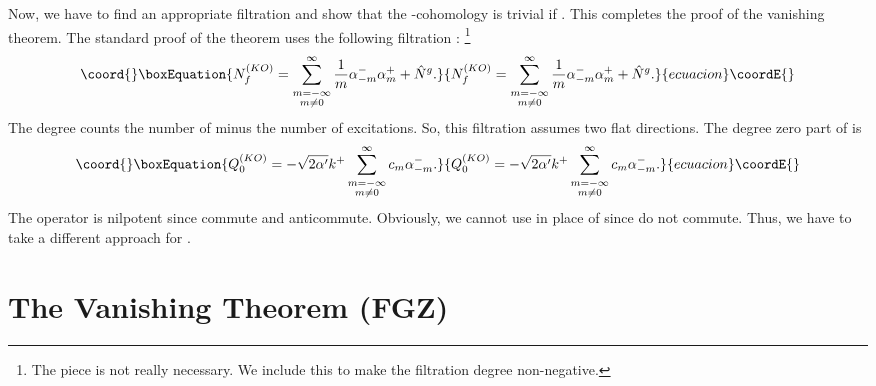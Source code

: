 \documentclass[a4paper,12pt]{article}
\providecommand{\hN}{\hat{N}^g}
\providecommand{\hQ}{\hat{Q}}
\begin{document}
Now, we have to find
an appropriate filtration and show that the \coordHE{}-cohomology is trivial
if \myHighlight{$\hN \neq 0$}\coordHE{}.
This completes the proof of the vanishing theorem.
The standard proof of the theorem  uses the
following filtration \cite{KO,BMP}:
\footnote{The \myHighlight{$\hN$}\coordHE{} piece is not really necessary.
We include this to make the filtration degree non-negative.}
\begin{equation}\coord{}\boxEquation{
N^{(KO)}_{f} = \sum_{\stackrel{\scriptstyle m=-\infty}{m \neq 0}}^{\infty}
        \frac{1}{m} \alpha^{-}_{-m} \alpha^{+}_{m} + \hN.
\label{eq:Nko}
}{
N^{(KO)}_{f} = \sum_{\stackrel{\scriptstyle m=-\infty}{m \neq 0}}^{\infty}
        \frac{1}{m} \alpha^{-}_{-m} \alpha^{+}_{m} + \hN.
}{ecuacion}\coordE{}\end{equation}
The degree \coordHE{} counts the number of \myHighlight{$\alpha^+$}\coordHE{} minus the number of
\myHighlight{$\alpha^-$}\coordHE{}
excitations. So, this filtration assumes two flat directions.
The degree zero
part of \myHighlight{$\hQ$}\coordHE{} is
\begin{equation}\coord{}\boxEquation{
Q^{(KO)}_{0} = -\sqrt{2 \alpha'} k^{+}
        \sum_{\stackrel{\scriptstyle m=-\infty}{m \neq 0}}^{\infty}
        c_{m} \alpha^{-}_{-m}.
}{
Q^{(KO)}_{0} = -\sqrt{2 \alpha'} k^{+}
        \sum_{\stackrel{\scriptstyle m=-\infty}{m \neq 0}}^{\infty}
        c_{m} \alpha^{-}_{-m}.
}{ecuacion}\coordE{}\end{equation}
The operator \coordHE{} is nilpotent since \coordHE{} commute and
\coordHE{} anticommute. Obviously, we cannot use \coordHE{} in place of
\coordHE{}
since \coordHE{} do not commute. Thus,
we have to take a different approach for \coordHE{}.



\section{The Vanishing Theorem (FGZ)}\label{sec:fgz}
\end{document}
